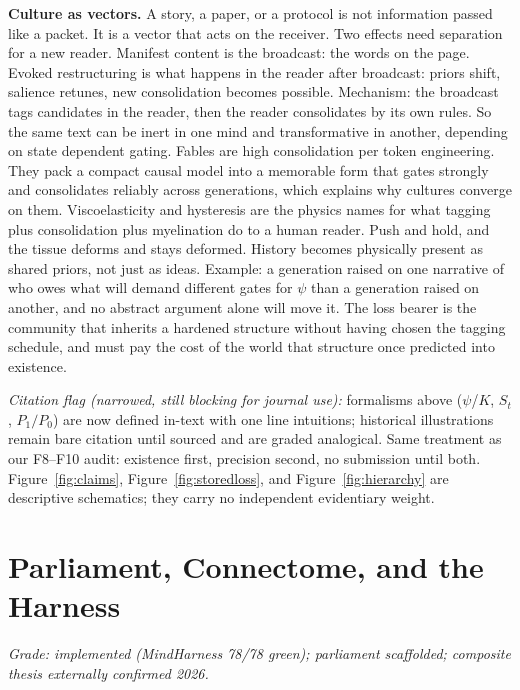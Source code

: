 \documentclass[11pt]{article}
\begin{document}
\textbf{Culture as vectors.} A story, a paper, or a protocol is not information passed like a packet. It is a vector that acts on the receiver. Two effects need separation for a new reader. Manifest content is the broadcast: the words on the page. Evoked restructuring is what happens in the reader after broadcast: priors shift, salience retunes, new consolidation becomes possible. Mechanism: the broadcast tags candidates in the reader, then the reader consolidates by its own rules. So the same text can be inert in one mind and transformative in another, depending on state dependent gating. Fables are high consolidation per token engineering. They pack a compact causal model into a memorable form that gates strongly and consolidates reliably across generations, which explains why cultures converge on them. Viscoelasticity and hysteresis are the physics names for what tagging plus consolidation plus myelination do to a human reader. Push and hold, and the tissue deforms and stays deformed. History becomes physically present as shared priors, not just as ideas. Example: a generation raised on one narrative of who owes what will demand different gates for $\psi$ than a generation raised on another, and no abstract argument alone will move it. The loss bearer is the community that inherits a hardened structure without having chosen the tagging schedule, and must pay the cost of the world that structure once predicted into existence.

\textit{Citation flag (narrowed, still blocking for journal use):} formalisms above ($\psi$/$K$, $S_t$, $P_1/P_0$) are now defined in-text with one line intuitions; historical illustrations remain bare citation until sourced and are graded analogical. Same treatment as our F8--F10 audit: existence first, precision second, no submission until both. Figure~\ref{fig:claims}, Figure~\ref{fig:storedloss}, and Figure~\ref{fig:hierarchy} are descriptive schematics; they carry no independent evidentiary weight.

\section{Parliament, Connectome, and the Harness}
\label{sec:harness}

\textit{Grade: implemented (MindHarness 78/78 green); parliament scaffolded; composite thesis externally confirmed 2026.}
\end{document}
